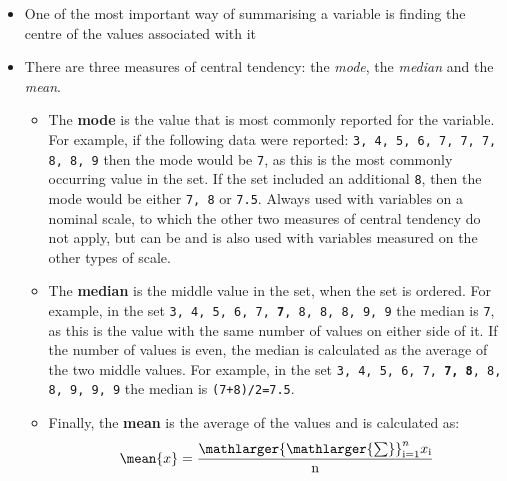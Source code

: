 \begin{itemize}
\item One of the most important way of summarising a variable is finding the centre of the values associated with it
\item There are three measures of central tendency: the \emph{mode}, the \emph{median} and the \emph{mean}. 
\begin{itemize}
\item The \textbf{mode} is the value that is most commonly reported for the variable. For example, if the following data were reported: \texttt{3, 4, 5, 6, 7, 7, 7, 8, 8, 9} then the mode would be \texttt{7}, as this is the most commonly occurring value in the set. If the set included an additional \texttt{8}, then the mode would be either \texttt{7, 8} or \texttt{7.5}. Always used with variables on a nominal scale, to which the other two measures of central tendency do not apply, but can be and is also used with variables measured on the other types of scale.
\item The \textbf{median} is the middle value in the set, when the set is ordered. For example, in the set \texttt{3, 4, 5, 6, 7, \textbf{7}, 8, 8, 8, 9, 9} the median is \texttt{7}, as this is the value with the same number of values on either side of it. If the number of values is even, the median is calculated as the average of the two middle values. For example, in the set \texttt{3, 4, 5, 6, 7, \textbf{7, 8}, 8, 8, 9, 9, 9} the median is \texttt{(7+8)/2=7.5}.
\item Finally, the \textbf{mean} is the average of the values and is calculated as:
$$\mean{x} = \dfrac{\mathlarger{\mathlarger{\sum}}_{\mathrm{i=1}}^{n} x_\mathrm{i}}{\mathrm{n}} $$
\end{itemize}
\end{itemize}

\newpage

